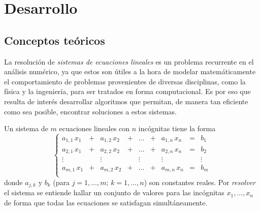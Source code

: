 \section{Desarrollo}

    \subsection{Conceptos teóricos} \label{subsec:conceptos-teoricos}

        La resolución de \emph{sistemas de ecuaciones lineales} es un problema recurrente en el análisis numérico, ya que estos son útiles a la hora de modelar matemáticamente el comportamiento de problemas provenientes de diversas disciplinas, como la física y la ingeniería, para ser tratados en forma computacional. Es por eso que resulta de interés desarrollar algoritmos que permitan, de manera tan eficiente como sea posible, encontrar soluciones a estos sistemas.

        Un sistema de $m$ ecuaciones lineales con $n$ incógnitas tiene la forma
        \[ \left\lbrace \begin{matrix}
                a_{1,1} \, x_1 & + & a_{1,2} \, x_2 & + & \dots  & + & a_{1,n} \, x_n & = & b_1    \\
                a_{2,1} \, x_1 & + & a_{2,2} \, x_2 & + & \dots  & + & a_{2,n} \, x_n & = & b_2    \\
                \vdots         &   & \vdots         &   & \vdots &   & \vdots         &   & \vdots \\
                a_{m,1} \, x_1 & + & a_{m,2} \, x_2 & + & \dots  & + & a_{m,n} \, x_n & = & b_m    \\
        \end{matrix} \right. \]
        donde $a_{j,k}$ y $b_k$ (para $j = 1, \dots, m$; $k = 1, \dots, n$) son constantes reales. Por \emph{resolver} el sistema se entiende hallar un conjunto de valores para las incógnitas $x_1, \dots, x_n$ de forma que todas las ecuaciones se satisfagan simultáneamente.

